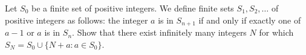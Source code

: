 Let $S_0$ be a finite set of positive integers.  We define finite
sets
$S_1,S_2,\ldots$ of positive integers as follows:
the integer $a$ is in $S_{n+1}$ if and only if exactly one of $a-1$ or $a$ is
in
$S_n$.
Show that there exist infinitely many integers $N$ for which
$S_N=S_0\cup\{N+a: a\in S_0\}$.

